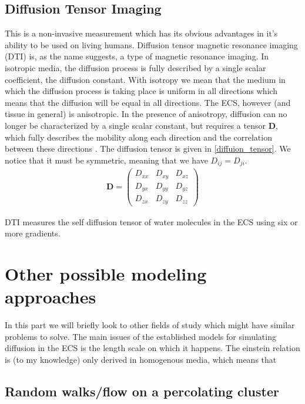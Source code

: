 \documentclass[a4paper,english, 12pt, twoside]{article}
\begin{document}
\subsection{Diffusion Tensor Imaging}
This is a non-invasive measurement which has its obvious advantages in it's ability to be used on living humans. 
Diffusion tensor magnetic resonance imaging (DTI) is, as the name suggests, a type of magnetic resonance imaging. 
In isotropic media, the diffusion process is fully described by a single scalar coefficient, the diffusion constant. 
With isotropy we mean that the medium in which the diffusion process is taking place is uniform in all directions which means that the diffusion will be equal in all directions. 
The ECS, however (and tissue in general) is anisotropic. 
In the presence of anisotropy, diffusion can no longer be characterized by a single scalar constant, but requires a tensor $\mathbf{D}$, which fully describes the mobility along each direction and the correlation between these directions \cite{le2001diffusion}. 
The diffusion tensor is given in \ref{diffuion_tensor}. We notice that it must be symmetric, meaning that we have $D_{ij} = D_{ji}$.
\begin{align}\label{diffuion_tensor}
 \mathbf{D} = \left(\begin{array}{ccc}
                     D_{xx} & D_{xy} & D_{xz}\\
                     D_{yx} & D_{yy} & D_{yz}\\
                     D_{zx} & D_{zy} & D_{zz}
                    \end{array}\right)
\end{align}

DTI measures the self diffusion tensor of water molecules in the ECS using six or more gradients. 

\section{Other possible modeling approaches}
In this part we will briefly look to other fields of study which might have similar problems to solve. 
The main issues of the established models for simulating diffusion in the ECS is the length scale on which it happens. 
The einstein relation is (to my knowledge) only derived in homogenous media, which means that 
\subsection{Random walks/flow on a percolating cluster}
\end{document}
